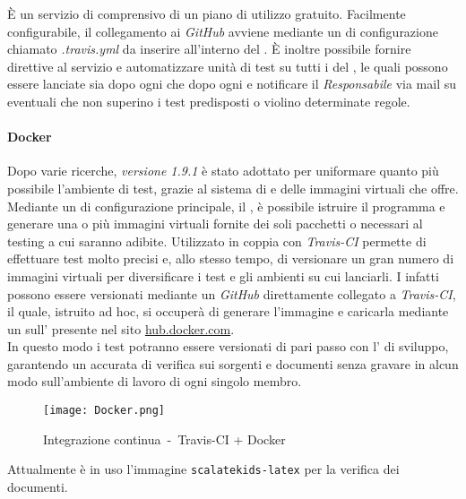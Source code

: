 \documentclass{scalatekids-article}
\begin{document}
È un servizio di  comprensivo di un piano di
utilizzo gratuito. Facilmente configurabile, il collegamento ai 
\textit{GitHub} avviene mediante un  di configurazione chiamato \textit{.travis.yml}
da inserire all'interno del . È inoltre possibile fornire
direttive al servizio e automatizzare unità di test su tutti i  del
, le quali possono essere lanciate sia dopo ogni 
che dopo ogni  e notificare il \textit{Responsabile} via mail su
eventuali  che non superino i test predisposti o violino
determinate regole.

\paragraph{Docker}

Dopo varie ricerche, \textit{ versione 1.9.1} è stato adottato per uniformare quanto più
possibile l'ambiente di test, grazie al sistema di  e
 delle immagini virtuali che offre.\\ Mediante un  di
configurazione principale, il , è possibile istruire il
programma e generare una o più immagini virtuali fornite dei soli pacchetti o
 necessari al testing a cui saranno adibite. Utilizzato in coppia con
\textit{Travis-CI} permette di effettuare test molto precisi e, allo stesso
tempo, di versionare un gran numero di immagini virtuali per diversificare i test e
gli ambienti su cui lanciarli. I  infatti possono essere
versionati mediante un  \textit{GitHub} direttamente collegato a
\textit{Travis-CI}, il quale, istruito ad hoc, si occuperà di generare
l'immagine  e caricarla mediante un  sull'
 presente nel sito \url{hub.docker.com}.\\ In questo modo i test
potranno essere versionati di pari passo con l' di sviluppo, garantendo
un accurata  di verifica sui sorgenti e documenti senza gravare in alcun
modo sull'ambiente di lavoro di ogni singolo membro.
\begin{figure}[H]
    \centering
    \texttt{[image: Docker.png]}
    \caption{Integrazione continua\ -\ Travis-CI + Docker}
\end{figure}
Attualmente è in uso l'immagine \verb=scalatekids-latex= per la verifica dei documenti.
\end{document}
